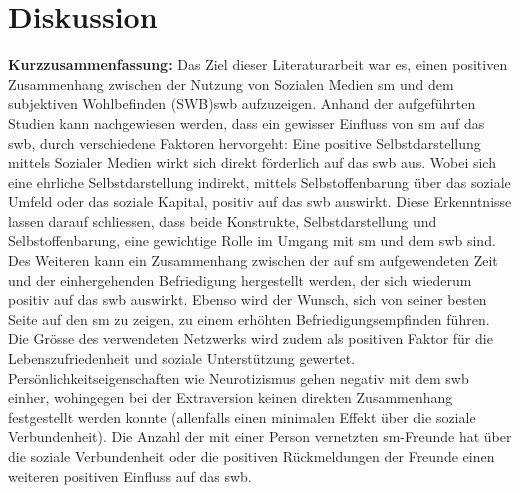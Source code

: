 %
%
\chapter{Diskussion}\label{chap.diskussion} 
\textbf{Kurzzusammenfassung:}\newline
Das Ziel dieser Literaturarbeit war es, einen positiven Zusammenhang zwischen der Nutzung von Sozialen Medien \gls{sm} und dem subjektiven Wohlbefinden (SWB)\gls{swb} aufzuzeigen. Anhand der aufgeführten Studien kann nachgewiesen werden, dass ein gewisser Einfluss von \gls{sm} auf das \gls{swb}, durch verschiedene Faktoren hervorgeht: Eine positive Selbstdarstellung mittels Sozialer Medien wirkt sich direkt förderlich auf das \gls{swb} aus. Wobei sich eine ehrliche Selbstdarstellung indirekt, mittels Selbstoffenbarung über das soziale Umfeld oder das soziale Kapital, positiv auf das \gls{swb} auswirkt. Diese Erkenntnisse lassen darauf schliessen, dass beide Konstrukte, Selbstdarstellung und Selbstoffenbarung, eine gewichtige Rolle im Umgang mit \gls{sm} und dem \gls{swb} sind. Des Weiteren kann ein Zusammenhang zwischen der auf \gls{sm} aufgewendeten Zeit und der einhergehenden Befriedigung hergestellt werden, der sich wiederum positiv auf das \gls{swb} auswirkt. Ebenso wird der Wunsch, sich von seiner besten Seite auf den \gls{sm} zu zeigen, zu einem erhöhten Befriedigungsempfinden führen. Die Grösse des verwendeten Netzwerks wird zudem als positiven Faktor für die Lebenszufriedenheit und soziale Unterstützung gewertet. Persönlichkeitseigenschaften wie Neurotizismus gehen negativ mit dem \gls{swb} einher, wohingegen bei der Extraversion keinen direkten Zusammenhang festgestellt werden konnte (allenfalls einen minimalen Effekt über die soziale Verbundenheit). Die Anzahl der mit einer Person vernetzten \gls{sm}-Freunde hat über die soziale Verbundenheit oder die positiven Rückmeldungen der Freunde einen weiteren positiven Einfluss auf das \gls{swb}.\par 
